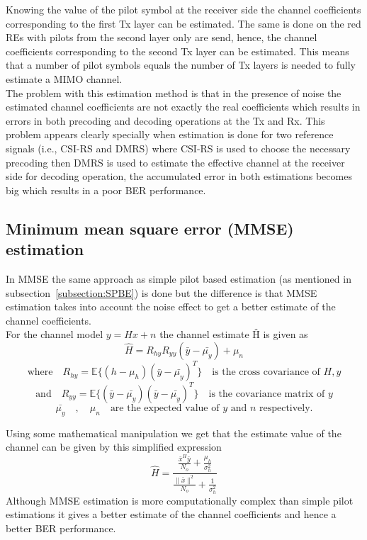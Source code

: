 Knowing the value of the pilot symbol at the receiver side the channel coefficients corresponding to the first Tx layer can be estimated.
\newline
The same is done on the red REs with pilots from the second layer only are send, hence, the channel coefficients corresponding to the second Tx layer can be estimated.
\newline
This means that a number of pilot symbols equals the number of Tx layers is needed to fully estimate a MIMO channel. \\

The problem with this estimation method is that in the presence of noise the estimated channel coefficients are not exactly the real coefficients which results in errors in both precoding and decoding operations at the Tx and Rx. This problem appears clearly specially when estimation is done for two reference signals (i.e., CSI-RS and DMRS) where CSI-RS is used to choose the necessary precoding then DMRS is used to estimate the effective channel at the receiver side for decoding operation, the accumulated error in both estimations becomes big which results in a poor BER performance.

\subsection{Minimum mean square error (MMSE) estimation}

In MMSE the same approach as simple pilot based estimation (as mentioned in subsection~\ref{subsection:SPBE}) is done but the difference is that MMSE estimation takes into account the noise effect to get a better estimate of the channel coefficients. \\
For the channel model $y=Hx+n$ the channel estimate \^{H} is given as
\begin{equation}
    \displaystyle
    \label{Estimated channel using MMSE}
    \hat{H} = R_{hy} R_{yy} (\bar{y} - \bar{\mu_y}) + \mu_n
\end{equation}
\[ \text{where} \quad R_{hy} = \mathbb{E}\{ (h - \mu_h) (\bar{y} - \bar{\mu_y})^T \} \quad \text{is the cross covariance of } H, y\]
\[ \text{and} \quad R_{yy} = \mathbb{E}\{ (\bar{y} - \bar{\mu_y}) (\bar{y} - \bar{\mu_y})^T \} \quad \text{is the covariance matrix of } y\]
\[ \bar{\mu_y} \quad , \quad \mu_n \quad \text{are the expected value of } y \text{ and } n \text{ respectively.} \]

Using some mathematical manipulation we get that the estimate value of the channel can be given by this simplified expression
\begin{equation}
    \label{Estimated channel using MMSE (simplified equation)}
    \hat{H} = \frac{ \frac{ \bar{x}^H \bar{y} }{N_o} + \frac{\mu_h}{\sigma^2_h}  }{ \frac{\|\bar{x}\|^2}{N_o} + \frac{1}{\sigma^2_h} }
\end{equation}
Although MMSE estimation is more computationally complex than simple pilot estimations it gives a better estimate of the channel coefficients and hence a better BER performance.

